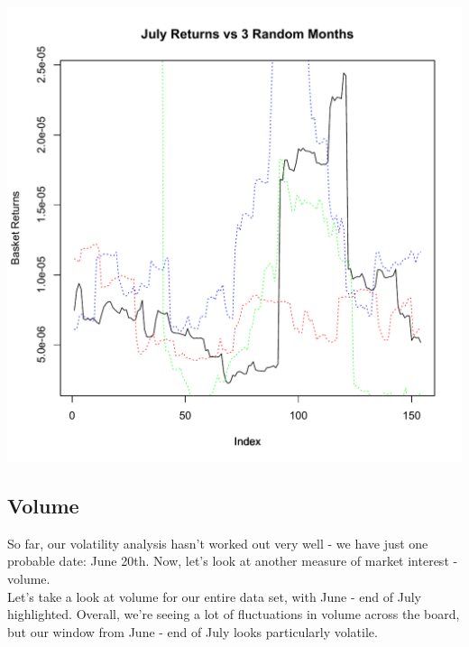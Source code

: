 \documentclass[11pt]{amsart}
\begin{document}
\includegraphics[scale=0.5]{july_3_months.pdf} \\

\newpage
\subsection{Volume}

So far, our volatility analysis hasn't worked out very well - we have just one probable date: June 20th. Now, let's look at another measure of market interest - volume.  \\

Let's take a look at volume for our entire data set, with June - end of July highlighted. Overall, we're seeing a lot of fluctuations in volume across the board, but our window from June - end of July looks particularly volatile. 
\end{document}
